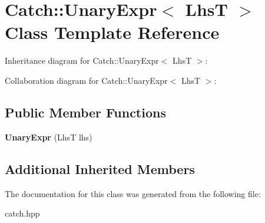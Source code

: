 \hypertarget{classCatch_1_1UnaryExpr}{}\section{Catch\+:\+:Unary\+Expr$<$ LhsT $>$ Class Template Reference}
\label{classCatch_1_1UnaryExpr}


Inheritance diagram for Catch\+:\+:Unary\+Expr$<$ LhsT $>$\+:


Collaboration diagram for Catch\+:\+:Unary\+Expr$<$ LhsT $>$\+:
\subsection*{Public Member Functions}
\begin{DoxyCompactItemize}
\item 
{\bfseries Unary\+Expr} (LhsT lhs)\hypertarget{classCatch_1_1UnaryExpr_ae02f666a1e64da728628aa2033e1d6e7}{}\label{classCatch_1_1UnaryExpr_ae02f666a1e64da728628aa2033e1d6e7}

\end{DoxyCompactItemize}
\subsection*{Additional Inherited Members}


The documentation for this class was generated from the following file\+:\begin{DoxyCompactItemize}
\item 
catch.\+hpp\end{DoxyCompactItemize}
